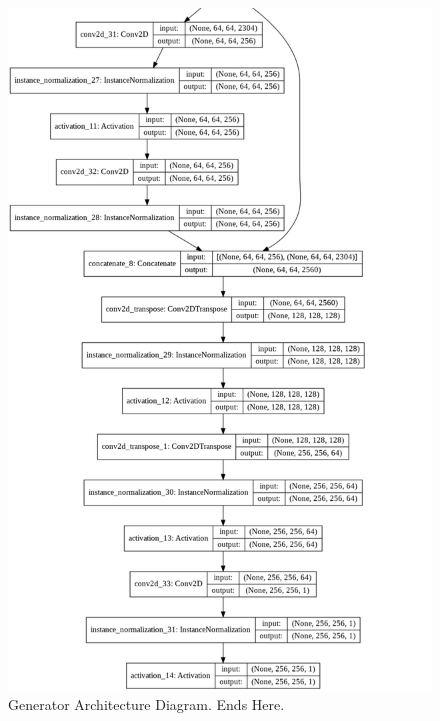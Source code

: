 \begin{figure}[H]
        \vspace*{1cm}
	    \begin{center} 
	    \includegraphics[scale=0.50]{images/generator_6.png}
	    \caption{Generator Architecture Diagram. Ends Here.}
	    \end{center}
\end{figure}


